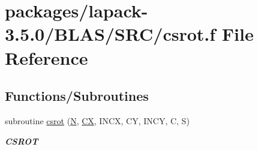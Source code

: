 \hypertarget{lapack-3_85_80_2BLAS_2SRC_2csrot_8f}{}\section{packages/lapack-\/3.5.0/\+B\+L\+A\+S/\+S\+R\+C/csrot.f File Reference}
\label{lapack-3_85_80_2BLAS_2SRC_2csrot_8f}
\subsection*{Functions/\+Subroutines}
\begin{DoxyCompactItemize}
\item 
subroutine \hyperlink{group__complex__blas__level1_gaf660f9cda67820f314f36c9668272987}{csrot} (\hyperlink{polmisc_8c_a0240ac851181b84ac374872dc5434ee4}{N}, \hyperlink{scsum1_8c_a5a76da95c549c41790389a76e12fdcb5}{C\+X}, I\+N\+C\+X, C\+Y, I\+N\+C\+Y, C, S)
\begin{DoxyCompactList}\small\item\em {\bfseries C\+S\+R\+O\+T} \end{DoxyCompactList}\end{DoxyCompactItemize}
